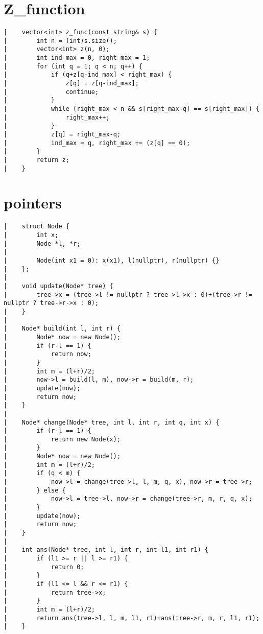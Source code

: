 \documentclass[a4paper, 10pt]{article}
\begin{document}
\begin{center}
\section*{Z\_function}
\begin{verbatim}
|    vector<int> z_func(const string& s) {
|        int n = (int)s.size();
|        vector<int> z(n, 0);
|        int ind_max = 0, right_max = 1;
|        for (int q = 1; q < n; q++) {
|            if (q+z[q-ind_max] < right_max) {
|                z[q] = z[q-ind_max];
|                continue;
|            }
|            while (right_max < n && s[right_max-q] == s[right_max]) {
|                right_max++;
|            }
|            z[q] = right_max-q;
|            ind_max = q, right_max += (z[q] == 0);
|        }
|        return z;
|    }
\end{verbatim}

\section*{pointers}
\begin{verbatim}
|    struct Node {
|        int x;
|        Node *l, *r;
|    
|        Node(int x1 = 0): x(x1), l(nullptr), r(nullptr) {}
|    };
|    
|    void update(Node* tree) {
|        tree->x = (tree->l != nullptr ? tree->l->x : 0)+(tree->r != nullptr ? tree->r->x : 0);
|    }
|    
|    Node* build(int l, int r) {
|        Node* now = new Node();
|        if (r-l == 1) {
|            return now;
|        }
|        int m = (l+r)/2;
|        now->l = build(l, m), now->r = build(m, r);
|        update(now);
|        return now;
|    }
|    
|    Node* change(Node* tree, int l, int r, int q, int x) {
|        if (r-l == 1) {
|            return new Node(x);
|        }
|        Node* now = new Node();
|        int m = (l+r)/2;
|        if (q < m) {
|            now->l = change(tree->l, l, m, q, x), now->r = tree->r;
|        } else {
|            now->l = tree->l, now->r = change(tree->r, m, r, q, x);
|        }
|        update(now);
|        return now;
|    }
|    
|    int ans(Node* tree, int l, int r, int l1, int r1) {
|        if (l1 >= r || l >= r1) {
|            return 0;
|        }
|        if (l1 <= l && r <= r1) {
|            return tree->x;
|        }
|        int m = (l+r)/2;
|        return ans(tree->l, l, m, l1, r1)+ans(tree->r, m, r, l1, r1);
|    }
\end{verbatim}


\end{center}
\end{document}
